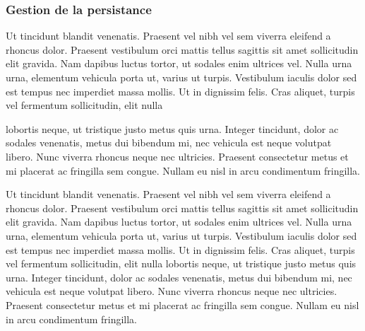 \subsubsection{Gestion de la persistance}

Ut tincidunt blandit venenatis. Praesent vel nibh vel sem viverra eleifend a rhoncus dolor. Praesent vestibulum orci mattis tellus sagittis sit amet sollicitudin elit gravida. Nam dapibus luctus tortor, ut sodales enim ultrices vel. Nulla urna urna, elementum vehicula porta ut, varius ut turpis. Vestibulum iaculis dolor sed est tempus nec imperdiet massa mollis. Ut in dignissim felis. Cras aliquet, turpis vel fermentum sollicitudin, elit
nulla

lobortis neque, ut tristique justo metus quis urna. Integer tincidunt, dolor ac sodales venenatis, metus dui bibendum mi, nec vehicula est neque volutpat libero. Nunc viverra rhoncus neque nec ultricies. Praesent consectetur metus et mi placerat ac fringilla sem congue. Nullam eu nisl in arcu condimentum fringilla. 

Ut tincidunt blandit venenatis. Praesent vel nibh vel sem viverra eleifend a rhoncus dolor. Praesent vestibulum orci mattis tellus sagittis sit amet sollicitudin elit gravida. Nam dapibus luctus tortor, ut sodales enim ultrices vel. Nulla urna urna, elementum vehicula porta ut, varius ut turpis. Vestibulum iaculis dolor sed est tempus nec imperdiet massa mollis. Ut in dignissim felis. Cras aliquet, turpis vel fermentum sollicitudin, elit nulla lobortis neque, ut tristique justo metus quis urna. Integer tincidunt, dolor ac sodales venenatis, metus dui bibendum mi, nec vehicula est neque volutpat libero. Nunc viverra rhoncus neque nec ultricies. Praesent consectetur metus et mi placerat ac fringilla sem congue. Nullam eu nisl in arcu condimentum fringilla. 
